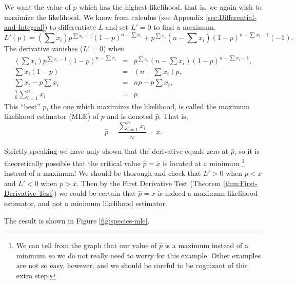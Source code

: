 \documentclass[captions=tableheading]{scrbook}
\begin{document}
\begin{example}
We want the value of \(p\) which has the highest likelihood, that is, we again wish to maximize the likelihood. We know from calculus (see Appendix \ref{sec:Differential-and-Integral}) to differentiate \(L\) and set \(L'=0\) to find a maximum.
\[
L'(p)=\left(\sum x_{i}\right)p^{\sum x_{i}-1}(1-p)^{n-\sum x_{i}}+p^{\sum x_{i}}\left(n-\sum x_{i}\right)(1-p)^{n-\sum x_{i}-1}(-1).
\]
The derivative vanishes (\(L'=0\)) when
\begin{eqnarray*}
\left(\sum x_{i}\right)p^{\sum x_{i}-1}(1-p)^{n-\sum x_{i}} & = & p^{\sum x_{i}}\left(n-\sum x_{i}\right)(1-p)^{n-\sum x_{i}-1},\\
\sum x_{i}(1-p) & = & \left(n-\sum x_{i}\right)p,\\
\sum x_{i}-p\sum x_{i} & = & np-p\sum x_{i},\\
\frac{1}{n}\sum_{i=1}^{n}x_{i} & = & p.
\end{eqnarray*}
This ``best'' \(p\), the one which maximizes the likelihood, is called the maximum likelihood estimator (MLE) of \(p\) and is denoted \(\hat{p}\). That is, 
\begin{equation} 
\hat{p}=\frac{\sum_{i=1}^{n}x_{i}}{n}=\overline{x}.
\end{equation}

\begin{rem}
Strictly speaking we have only shown that the derivative equals zero at \(\hat{p}\), so it is theoretically possible that the critical value \(\hat{p}=\overline{x}\) is located at a minimum
\footnote{We can tell from the graph that our value of \(\hat{p}\) is a maximum instead of a minimum so we do not really need to worry for this example. Other examples are not so easy, however, and we should be careful to be cognizant of this extra step.}
instead of a maximum! We should be thorough and check that \(L'>0\) when \(p<\overline{x}\) and \(L'<0\) when \(p>\overline{x}\). Then by the First Derivative Test (Theorem \ref{thm:First-Derivative-Test}) we could be certain that \(\hat{p}=\overline{x}\) is indeed a maximum likelihood estimator, and not a minimum likelihood estimator.
\end{rem}

The result is shown in Figure \ref{fig:species-mle}.
\end{example}
\end{document}
